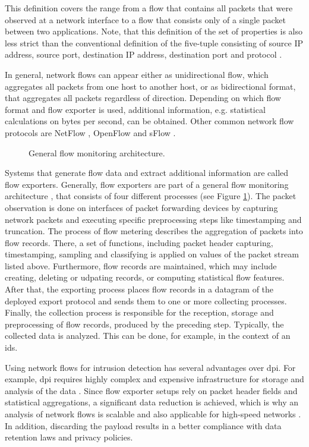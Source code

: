 This definition covers the range from a flow that contains all packets that were observed at a network interface to a flow that consists only of a single packet between two applications. Note, that this definition of the set of properties is also less strict than the conventional definition of the five-tuple consisting of source IP address, source port, destination IP address, destination port and protocol \cite{rfc5101}.

In general, network flows can appear either as unidirectional flow, which aggregates all packets from one host to another host, or as bidirectional format, that aggregates all packets regardless of direction. Depending on which flow format and flow exporter is used, additional information, e.g. statistical calculations on bytes per second, can be obtained. Other common network flow protocols are NetFlow \cite{rfc3954}, OpenFlow \cite{mck_2008} and sFlow \cite{pha_2004}.

\begin{figure}[t]
    \centering
    
    \caption[General flow monitoring architecture]{General flow monitoring architecture.}
    \label{fig:flow-export}
\end{figure}


Systems that generate flow data and extract additional information are called flow exporters. Generally, flow exporters are part of a general flow monitoring architecture \cite{hof_2014}, that consists of four different processes (see Figure \ref{fig:flow-export}). The packet observation is done on interfaces of packet forwarding devices by capturing network packets and executing specific preprocessing steps like timestamping and truncation. The process of flow metering describes the aggregation of packets into flow records. There, a set of functions, including packet header capturing, timestamping, sampling and classifying is applied on values of the packet stream listed above. Furthermore, flow records are  maintained, which may include creating, deleting or udpating records, or computing statistical flow features. After that, the exporting process places flow records in a datagram of the deployed export protocol and sends them to one or more collecting processes. Finally, the collection process is responsible for the reception, storage and preprocessing of flow records, produced by the preceding step. Typically, the collected data is analyzed. This can be done, for example, in the context of an \gls{ids}.

Using network flows for intrusion detection has several advantages over \gls{dpi}. For example, \gls{dpi} requires highly complex and expensive infrastructure for storage and analysis of the data \cite{hof_2014}. Since flow exporter setups rely on packet header fields and statistical aggregations, a significant data reduction is achieved, which is why an analysis of network flows is scalable and also applicable for high-speed networks \cite{hof_2014}. In addition, discarding the payload results in a better compliance with data retention laws and privacy policies.